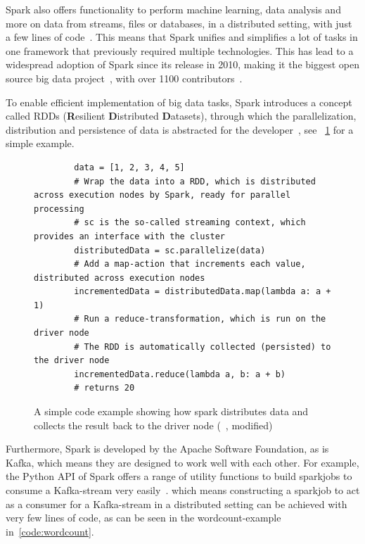 \par
Spark also offers functionality to perform machine learning, data analysis and more on data from streams,
files or databases, in a distributed setting, with just a few lines of code~\cite{sparkDocs}.
This means that Spark unifies and simplifies a lot of tasks in one framework that previously required multiple technologies.
This has lead to a widespread adoption of Spark since its release in 2010,
making it the biggest open source big data project~\cite{Zaharia2016}, with over 1100 contributors~\cite{sparkContributor}.

\par
To enable efficient implementation of big data tasks, Spark introduces a concept called RDDs
(\textbf{R}esilient \textbf{D}istributed \textbf{D}atasets),
through which the parallelization, distribution and persistence of data is abstracted for the developer~\cite{sparkDocs},
see ~\ref{code:simpleParallelization} for a simple example.

\begin{figure}
    \caption{A simple code example showing how spark distributes data and collects the result back to the driver node (~\cite{sparkDocs}, modified)}
    \label{code:simpleParallelization}
    \begin{verbatim}
        data = [1, 2, 3, 4, 5]
        # Wrap the data into a RDD, which is distributed across execution nodes by Spark, ready for parallel processing
        # sc is the so-called streaming context, which provides an interface with the cluster
        distributedData = sc.parallelize(data)
        # Add a map-action that increments each value, distributed across execution nodes
        incrementedData = distributedData.map(lambda a: a + 1)
        # Run a reduce-transformation, which is run on the driver node
        # The RDD is automatically collected (persisted) to the driver node
        incrementedData.reduce(lambda a, b: a + b)
        # returns 20
    \end{verbatim}
\end{figure}

Furthermore, Spark is developed by the Apache Software Foundation, as is Kafka,
which means they are designed to work well with each other.
For example, the Python API of Spark offers a range of utility functions to build sparkjobs to consume a Kafka-stream very easily~\cite{sparkDocs}.
which means constructing a sparkjob to act as a consumer for a Kafka-stream in a distributed setting can be achieved with very few lines of code,
as can be seen in the wordcount-example in~\ref{code:wordcount}.

